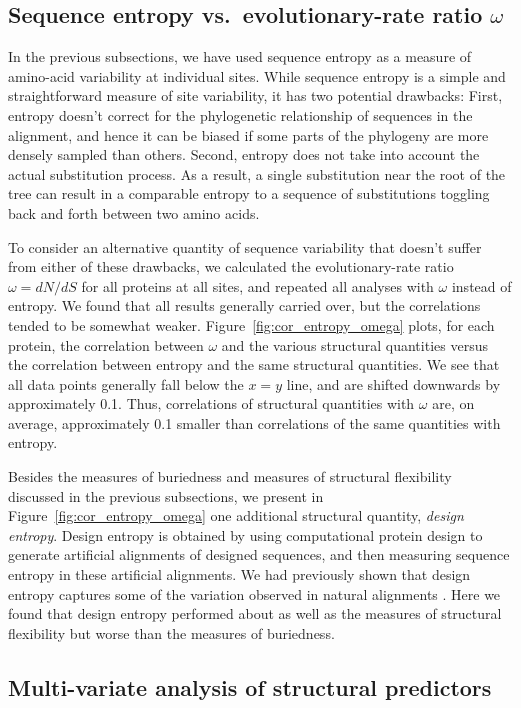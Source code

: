 \documentclass[12pt]{article}
\begin{document}
\subsection*{Sequence entropy vs.\ evolutionary-rate ratio $\omega$}

In the previous subsections, we have used sequence entropy as a measure of amino-acid variability at individual sites. While sequence entropy is a simple and straightforward measure of site variability, it has two potential drawbacks: First, entropy doesn't correct for the phylogenetic relationship of sequences in the alignment, and hence it can be biased if some parts of the phylogeny are more densely sampled than others. Second, entropy does not take into account the actual substitution process. As a result, a single substitution near the root of the tree can result in a comparable entropy to a sequence of substitutions toggling back and forth between two amino acids.

To consider an alternative quantity of sequence variability that doesn't suffer from either of these drawbacks, we calculated the evolutionary-rate ratio $\omega=dN/dS$ for all proteins at all sites, and repeated all analyses with $\omega$ instead of entropy. We found that all results generally carried over, but the correlations tended to be somewhat weaker. Figure~\ref{fig:cor_entropy_omega} plots, for each protein, the correlation between $\omega$ and the various structural quantities versus the correlation between entropy and the same structural quantities. We see that all data points generally fall below the $x=y$ line, and are shifted downwards by approximately 0.1. Thus, correlations of structural quantities with $\omega$ are, on average, approximately 0.1 smaller than correlations of the same quantities with entropy.

Besides the measures of buriedness and measures of structural flexibility discussed in the previous subsections, we present in  Figure~\ref{fig:cor_entropy_omega} one additional structural quantity, \emph{design entropy}. Design entropy is obtained by using computational protein design to generate artificial alignments of designed sequences, and then measuring sequence entropy in these artificial alignments. We had previously shown that design entropy captures some of the variation observed in natural alignments \citep{Jacksonetal2013}. Here we found that design entropy performed about as well as the measures of structural flexibility but worse than the measures of buriedness.

\subsection*{Multi-variate analysis of structural predictors}
\end{document}
